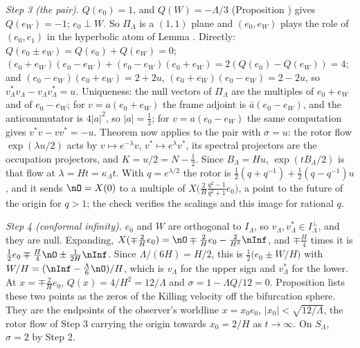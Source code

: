 \emph{Step 3 (the pair).} $Q(e_{0}) = 1$, and $Q(W) = -\Lambda/3$ (Proposition ) gives $Q(e_{W}) = -1$; $e_{0} \perp W$. So $\Pi_{\Lambda}$ is a $(1,1)$ plane and $(e_{0}, e_{W})$ plays the role of $(e_{0}, e_{1})$ in the hyperbolic atom of Lemma . Directly: $Q(e_{0} \pm e_{W}) = Q(e_{0}) + Q(e_{W}) = 0$; $(e_{0} + e_{W})(e_{0} - e_{W}) + (e_{0} - e_{W})(e_{0} + e_{W}) = 2(Q(e_{0}) - Q(e_{W})) = 4$; and $(e_{0} - e_{W})(e_{0} + e_{W}) = 2 + 2u$, $(e_{0} + e_{W})(e_{0} - e_{W}) = 2 - 2u$, so $v_{\Lambda}^{*}v_{\Lambda} - v_{\Lambda}v_{\Lambda}^{*} = u$. Uniqueness: the null vectors of $\Pi_{\Lambda}$ are the multiples of $e_{0} + e_{W}$ and of $e_{0} - e_{W}$; for $v = a(e_{0} + e_{W})$ the frame adjoint is $\bar a(e_{0} - e_{W})$, and the anticommutator is $4|a|^{2}$, so $|a| = \tfrac12$; for $v = a(e_{0} - e_{W})$ the same computation gives $v^{*}v - vv^{*} = -u$. Theorem  now applies to the pair with $\sigma = u$: the rotor flow $\exp(\lambda u/2)$ acts by $v \mapsto e^{-\lambda}v$, $v^{*} \mapsto e^{\lambda}v^{*}$, its spectral projectors are the occupation projectors, and $K = u/2 = N - \tfrac12$. Since $B_{\Lambda} = Hu$, $\exp(tB_{\Lambda}/2)$ is that flow at $\lambda = Ht = \kappa_{\Lambda}t$. With $q = e^{\lambda/2}$ the rotor is $\tfrac12(q + q^{-1}) + \tfrac12(q - q^{-1})u$, and it sends $\nO = X(0)$ to a multiple of $X\bigl(\tfrac{2}{H}\tfrac{q^{2} - 1}{q^{2} + 1}e_{0}\bigr)$, a point to the future of the origin for $q > 1$; the check verifies the scalings and this image for rational $q$.

\emph{Step 4 (conformal infinity).} $e_{0}$ and $W$ are orthogonal to $I_{\Lambda}$, so $v_{\Lambda}, v_{\Lambda}^{*} \in I_{\Lambda}^{\perp}$, and they are null. Expanding, $X(\mp\tfrac{2}{H}e_{0}) = \nO \mp \tfrac{2}{H}e_{0} - \tfrac{2}{H^{2}}\nInf$, and $\mp\tfrac{H}{4}$ times it is $\tfrac12 e_{0} \mp \tfrac{H}{4}\nO \pm \tfrac{1}{2H}\nInf$. Since $\Lambda/(6H) = H/2$, this is $\tfrac12\bigl(e_{0} \pm W/H\bigr)$ with $W/H = (\nInf - \tfrac{\Lambda}{6}\nO)/H$, which is $v_{\Lambda}$ for the upper sign and $v_{\Lambda}^{*}$ for the lower. At $x = \mp\tfrac{2}{H}e_{0}$, $Q(x) = 4/H^{2} = 12/\Lambda$ and $\sigma = 1 - \Lambda Q/12 = 0$. Proposition  lists these two points as the zeros of the Killing velocity off the bifurcation sphere. They are the endpoints of the observer's worldline $x = x_{0}e_{0}$, $|x_{0}| < \sqrt{12/\Lambda}$, the rotor flow of Step 3 carrying the origin towards $x_{0} = 2/H$ as $t \to \infty$. On $S_{\Lambda}$, $\sigma = 2$ by Step 2.

